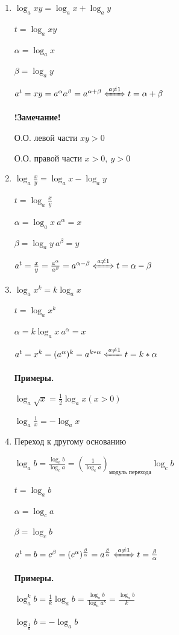 \documentclass{article}
\begin{document}
    \begin{enumerate}
        \item \(\log_a xy = \log_a x + \log_a y\)

        \( t = \log_a xy \)
        
        \( \alpha = \log_a x \)

        \( \beta = \log_a y \)
        
        \(a^t = xy = a^{\alpha}a^{\beta} = a^{\alpha+\beta} \xLeftrightarrow[]{a \neq 1} t = \alpha + \beta\)

        \textbf{!Замечание!}
        
        О.О. левой части \(xy > 0\)

        О.О. правой части \(x > 0,\ y > 0\)

        \item \( \log_a \frac{x}{y} = \log_a x - \log_a y \)
        
        \( t = \log_a \frac{x}{y} \)
        
        \( \alpha = \log_a x\ a^{\alpha} = x \)

        \( \beta = \log_a y\ a^{\beta} = y \)

        \( a^t = \frac{x}{y} = \frac{a^{\alpha}}{a^{\beta}} = a^{\alpha - \beta} \xLeftrightarrow[]{a \neq 1} t = \alpha - \beta \)
        
        \item \(\log_a x^k = k\log_a x\)
        
        \( t = \log_a x^k \)

        \( \alpha = k\log_a x\ a^{\alpha} = x \)
        
        \(a^t = x^k = (a^\alpha)^k = a^{k*\alpha} \xLeftarrow[]{a \neq 1} t = k*\alpha\)

        \textbf{Примеры.}

        \( \log_a \sqrt{x} = \frac{1}{2}\log_a x (x > 0)\)

        \( \log_a \frac{1}{x} = -\log_a x \)
        
        \item Переход к другому основанию

        \(\log_a b = \frac{\log_c b}{\log_c a} = (\frac{1}{\log_c a})_{\textrm{модуль перехода}}\log_c b\)
    
        \( t = \log_a b \)

        \( \alpha = \log_c a \)
        
        \( \beta = \log_c b \) 
        
        \(a^t = b = c^\beta = (c^\alpha)^\frac{\beta}{\alpha} = a^\frac{\beta}{\alpha} \xLeftrightarrow[]{a \neq 1} t = \frac{\beta}{\alpha} \)
    
        \textbf{Примеры.}
        
        \( \log_a^k b = \frac{1}{k}\log_a b = \frac{\log_a b}{\log_a a^k} = \frac{\log_a b}{k}\)

        \( \log_\frac{1}{a} b = -\log_a b \)
    \end{enumerate}
\end{document}
